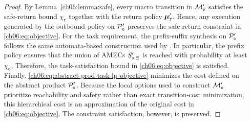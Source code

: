 \begin{proof}
By Lemma~\ref{ch06:lemma:safe}, every macro transition in
\(\mathcal{M}'_{\textup{\texttt{o}}}\) satisfies the safe-return bound
\(\chi_{\texttt{r}}\) together with the return policy
\(\boldsymbol{\mu}'_{\textup{\texttt{r}}}\). Hence, any execution generated by
the outbound policy on \(\mathcal{P}'_{\textup{\texttt{o}}}\) preserves the
safe-return constraint in \eqref{ch06:eq:objective}.
For the task requirement, the prefix-suffix synthesis on
\(\mathcal{P}'_{\textup{\texttt{o}}}\) follows the same automata-based
construction used by \citet{guo2018probabilistic}. In particular, the prefix
policy ensures that the union of AMECs \(S'_{\textup{\texttt{o}},\Xi}\) is
reached with probability at least \(\chi_{\texttt{o}}\),  Therefore, the
task-satisfaction bound in \eqref{ch06:eq:objective} is satisfied.
Finally, \eqref{ch06:eq:abstract-prod-task-lp-objective} minimizes the cost
defined on the abstract product \(\mathcal{P}'_{\textup{\texttt{o}}}\).
Because the local options used to construct
\(\mathcal{M}'_{\textup{\texttt{o}}}\) prioritize reachability and safety
rather than exact transition-cost minimization, this hierarchical cost is an
approximation of the original cost in \eqref{ch06:eq:objective}. The
constraint satisfaction, however, is preserved.
\end{proof}
